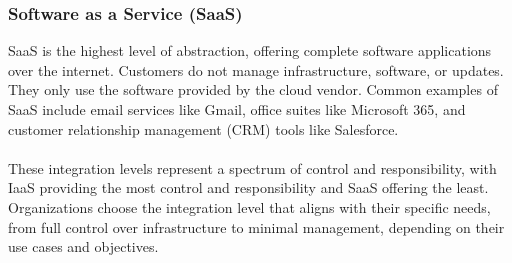 \subsubsection{Software as a Service (SaaS)}
SaaS is the highest level of abstraction, offering complete software applications over the internet.
Customers do not manage infrastructure, software, or updates. They only use the software provided by the cloud vendor.
Common examples of SaaS include email services like Gmail, office suites like Microsoft 365, and customer relationship management (CRM) tools like Salesforce.
\\\\
These integration levels represent a spectrum of control and responsibility, 
with IaaS providing the most control and responsibility and SaaS offering the least. Organizations choose the integration level that aligns with their specific needs, from full control over infrastructure to minimal management, depending on their use cases and objectives.

